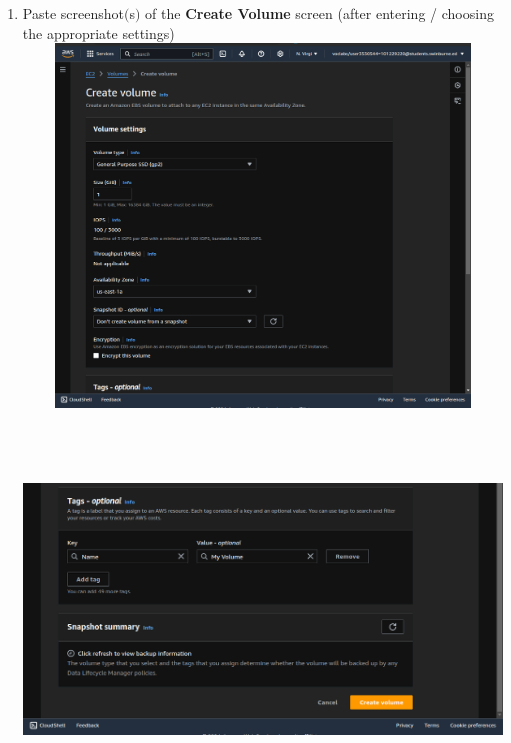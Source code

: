 \documentclass[11pt]{article}
\begin{document}
\begin{enumerate}
    \vspace{75mm}

    \item Paste screenshot$($s$)$ of the \textbf{Create Volume} screen   (after entering / choosing the appropriate settings) \\

    {\centering
    \includegraphics[width=6.1in, height=3.8in]{pics/3a.png}
    }


    {\centering
    \includegraphics[width=6.1in, height=3.8in]{pics/3b.png}
    }


\end{enumerate}


\vspace{5mm}

\newpage
\end{document}
